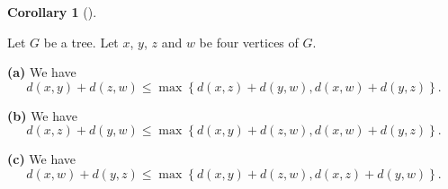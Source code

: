 \documentclass[numbers=enddot,12pt,final,onecolumn,notitlepage]{scrartcl}%
\theoremstyle{definition}
\newtheorem{coro}[theo]{Corollary}
\newenvironment{corollary}[1][]
{\begin{coro}[#1]\begin{leftbar}}
{\end{leftbar}\end{coro}}
\newcommand{\set}[1]{\left\{ #1 \right\}}
\newcommand{\tup}[1]{\left( #1 \right)}
\begin{document}
\begin{corollary} \label{cor.mt2.tropigrass.3ineqs}
Let $G$ be a tree.
Let $x$, $y$, $z$ and $w$ be four vertices of $G$.

\textbf{(a)} We have
\begin{equation}
d \tup{x, y} + d \tup{z, w}
\leq \max
  \set{ d \tup{x, z} + d \tup{y, w}, d \tup{x, w} + d \tup{y, z} } .
\label{eq.cor.mt2.tropigrass.3ineqs.a}
\end{equation}

\textbf{(b)} We have
\begin{equation}
d \tup{x, z} + d \tup{y, w}
\leq \max
  \set{ d \tup{x, y} + d \tup{z, w}, d \tup{x, w} + d \tup{y, z} } .
\label{eq.cor.mt2.tropigrass.3ineqs.b}
\end{equation}

\textbf{(c)} We have
\begin{equation}
d \tup{x, w} + d \tup{y, z}
\leq \max
  \set{ d \tup{x, y} + d \tup{z, w}, d \tup{x, z} + d \tup{y, w} } .
\label{eq.cor.mt2.tropigrass.3ineqs.c}
\end{equation}
\end{corollary}
\end{document}
